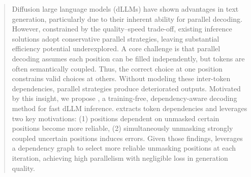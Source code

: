 \begin{abstract}
    Diffusion large language models (dLLMs) have shown advantages in text generation, particularly due to their inherent ability for parallel decoding. 
    However, constrained by the quality--speed trade-off, existing inference solutions adopt conservative parallel strategies, leaving substantial efficiency potential underexplored. A core challenge is that parallel decoding assumes each position can be filled independently, but tokens are often semantically coupled. Thus, the correct choice at one position constrains valid choices at others. Without modeling these inter-token dependencies, parallel strategies produce deteriorated outputs. 
    Motivated by this insight, we propose \textbf{\dawn{}}, a training-free, dependency-aware decoding method for fast dLLM inference. 
    \dawn{} extracts token dependencies and leverages two key motivations: (1) positions dependent on unmasked certain positions become more reliable, (2) simultaneously unmasking strongly coupled uncertain positions induces errors.
    Given those findings, \dawn{} leverages a dependency graph to select more reliable unmasking positions at each iteration, achieving high parallelism with negligible loss in generation quality.

\end{abstract}
